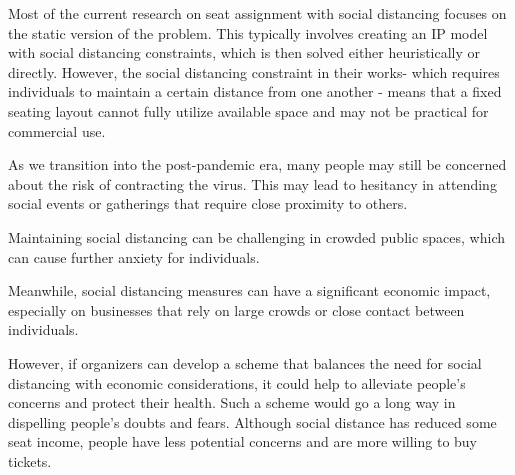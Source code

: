 Most of the current research on seat assignment with social distancing focuses on the static version of the problem. This typically involves creating an IP model with social distancing constraints, which is then solved either heuristically or directly. However, the social distancing constraint in their works- which requires individuals to maintain a certain distance from one another - means that a fixed seating layout cannot fully utilize available space and may not be practical for commercial use.

As we transition into the post-pandemic era, many people may still be concerned about the risk of contracting the virus. This may lead to hesitancy in attending social events or gatherings that require close proximity to others.

Maintaining social distancing can be challenging in crowded public spaces, which can cause further anxiety for individuals.

Meanwhile, social distancing measures can have a significant economic impact, especially on businesses that rely on large crowds or close contact between individuals.

However, if organizers can develop a scheme that balances the need for social distancing with economic considerations, it could help to alleviate people's concerns and protect their health. Such a scheme would go a long way in dispelling people's doubts and fears. Although social distance has reduced some seat income, people have less potential concerns and are more willing to buy tickets.









